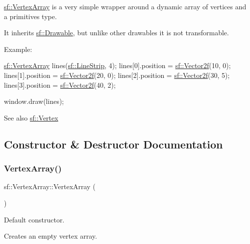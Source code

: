\hyperlink{classsf_1_1_vertex_array}{sf\+::\+Vertex\+Array} is a very simple wrapper around a dynamic array of vertices and a primitives type.

It inherits \hyperlink{classsf_1_1_drawable}{sf\+::\+Drawable}, but unlike other drawables it is not transformable.

Example\+: 
\begin{DoxyCode}
\hyperlink{classsf_1_1_vertex_array}{sf::VertexArray} lines(\hyperlink{group__graphics_gga5ee56ac1339984909610713096283b1ba14d9eeec2c7c314f239a57bde35949fa}{sf::LineStrip}, 4);
lines[0].position = \hyperlink{classsf_1_1_vector2}{sf::Vector2f}(10, 0);
lines[1].position = \hyperlink{classsf_1_1_vector2}{sf::Vector2f}(20, 0);
lines[2].position = \hyperlink{classsf_1_1_vector2}{sf::Vector2f}(30, 5);
lines[3].position = \hyperlink{classsf_1_1_vector2}{sf::Vector2f}(40, 2);

window.draw(lines);
\end{DoxyCode}


\begin{DoxySeeAlso}{See also}
\hyperlink{classsf_1_1_vertex}{sf\+::\+Vertex} 
\end{DoxySeeAlso}


\subsection{Constructor \& Destructor Documentation}
\mbox{\label{classsf_1_1_vertex_array_a15729e01df8fc0021f9774dfb56295c1}} 
\subsubsection{\texorpdfstring{Vertex\+Array()}{VertexArray()}\hspace{0.1cm}{\footnotesize\ttfamily [1/2]}}
{\footnotesize\ttfamily sf\+::\+Vertex\+Array\+::\+Vertex\+Array (\begin{DoxyParamCaption}{ }\end{DoxyParamCaption})}



Default constructor. 

Creates an empty vertex array. \mbox{\label{classsf_1_1_vertex_array_a4bb1c29a0e3354a035075899d84f02f9}} 
